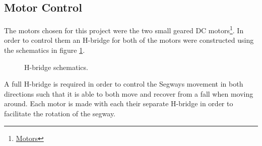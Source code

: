 
\subsection{Motor Control}
The motors chosen for this project were the two small geared DC motors\footnote{ \href{https://www.sparkfun.com/products/13258}{Motors}}.
In order to control them an H-bridge for both of the motors were constructed using the schematics in figure \ref{fig:hbridge}.


\begin{figure}[H]
\centering
\caption{H-bridge schematics.}
\label{fig:hbridge}
\end{figure}

A full H-bridge is required in order to control the Segways movement in both directions such that it is able to both move and recover from a fall when moving around.
Each motor is made with each their separate H-bridge in order to facilitate the rotation of the segway.

